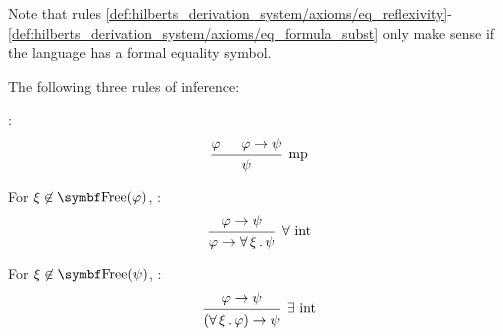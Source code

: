 \begin{definition}
\begin{reflist}
    Note that rules \eqref{def:hilberts_derivation_system/axioms/eq_reflexivity}-\eqref{def:hilberts_derivation_system/axioms/eq_formula_subst} only make sense if the language has a formal equality symbol.

     The following three rules of inference:
    \begin{defenum}
       :
      \begin{equation}\label{eq:def:hilberts_derivation_system/rules/modus_ponens}
        \begin{prooftree}
          \hypo{\varphi}
          \hypo{\varphi \to \psi}
          \infer2[mp]{\psi}
        \end{prooftree}
      \end{equation}

       For \( \xi \not\in \bop{Free}(\varphi) \), :
      \begin{equation}\label{eq:def:hilberts_derivation_system/rules/forall_intro}
        \begin{prooftree}
          \hypo{\varphi \to \psi}
          \infer1[\( \forall \) \text{int}]{\varphi \to \qforall{\xi} \psi}
        \end{prooftree}
      \end{equation}

       For \( \xi \not\in \bop{Free}(\psi) \), :
      \begin{equation}\label{eq:def:hilberts_derivation_system/rules/exists_intro}
        \begin{prooftree}
          \hypo{\varphi \to \psi}
          \infer1[\( \exists \) \text{int}]{(\qforall{\xi} \varphi) \to \psi}
        \end{prooftree}
      \end{equation}
    \end{defenum}
  \end{reflist}
\end{definition}

